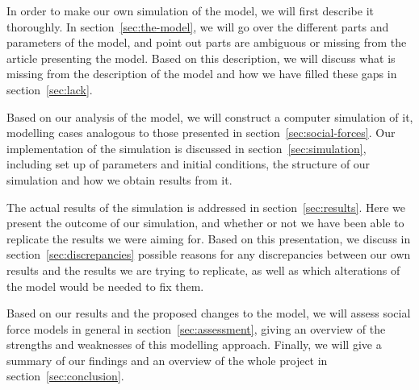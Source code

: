 In order to make our own simulation of the model, we will first describe it 
thoroughly. In section~\ref{sec:the-model}, we will go over the different 
parts and parameters of the model, and point out parts are ambiguous or 
missing from the article presenting the model.  Based on this description, we 
will discuss what is missing from the description of the model and how we have 
filled these gaps in section~\ref{sec:lack}.

Based on our analysis of the model, we will construct a computer simulation of 
it, modelling cases analogous to those presented in 
section~\ref{sec:social-forces}. Our implementation of the 
simulation is discussed in section~\ref{sec:simulation}, including set up of 
parameters and initial conditions, the structure of our simulation and how we 
obtain results from it.

The actual results of the simulation is addressed in 
section~\ref{sec:results}. Here we present the outcome of our simulation, and 
whether or not we have been able to replicate the results we were aiming for.  
Based on this presentation, we discuss in section~\ref{sec:discrepancies} 
possible reasons for any discrepancies between our own results and the results 
we are trying to replicate, as well as which alterations of the model would 
be needed to fix them.

Based on our results and the proposed changes to the model, we will assess 
social force models in general in section~\ref{sec:assessment}, giving an 
overview of the strengths and weaknesses of this modelling approach. Finally, 
we will give a summary of our findings and an overview of the whole project in 
section~\ref{sec:conclusion}.
